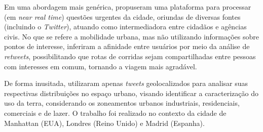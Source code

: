 \documentclass[
	12pt,				%
	oneside,			%
	a4paper,			%
	english,			%
	brazil				%
	]{abntex2ppgsi}
\begin{document}
Em uma abordagem mais genérica, \cite{Mukherjee2015} propuseram uma plataforma para processar (em \textit{near real time}) questões urgentes da cidade, oriundas de diversas fontes (incluindo o \textit{Twitter}), atuando como intermediadora entre cidadãos e agências civis. No que se refere a mobilidade urbana, mas não utilizando informações sobre pontos de interesse, \cite{Yousaf2014} inferiram a afinidade entre usuários por meio da análise de \textit{retweets}, possibilitando que rotas de corridas sejam compartilhadas entre pessoas com interesses em comum, tornando a viagem mais agradável.

De forma inusitada, \cite{Frias-Martinez2014} utilizaram apenas \textit{tweets} geolocalizados para analisar suas respectivas distribuições no espaço urbano, visando identificar a caracterização do uso da terra, considerando os zoneamentos urbanos industriais, residenciais, comerciais e de lazer. O trabalho foi realizado no contexto da cidade de Manhattan (EUA), Londres (Reino Unido) e Madrid (Espanha).
\end{document}
